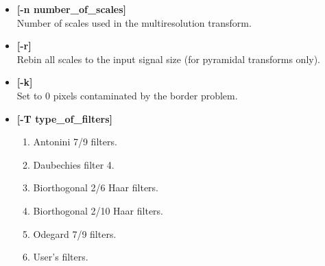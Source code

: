 \begin{itemize}
\begin{enumerate}
\begin{eqnarray}
\psi(x) =  \left \{
\begin{array}{ll}
     0  & \mbox{ if }  \mid \frac{x}{\sigma} \mid > 1 \\
     -1 & \mbox{ if } \mid  \frac{x}{\sigma} \mid \in [\frac{1}{3},1]  \\
     2  & \mbox{ if } \mid  \frac{x}{\sigma} \mid < \frac{1}{3}
\end{array}
\right.
\end{eqnarray}  
First scale $\sigma_0$ equal to $0.66$, and 12 voices per octave. 
\item Gaussian derivative wavelet transform \\
 Continuous wavelet transform. The wavelet is the first 
derivative of a Gaussian
 \begin{eqnarray}
 \psi(x) =  - x e^{-\frac{1}{2}x^2} 
 \end{eqnarray}
 First scale $\sigma_0$ equal to $\frac{1}{\sqrt{3}}$, and 12 voices per octave. 
\item (bi-) orthogonal transform. 
\item (bi-) orthogonal transform via lifting scheme. 
\item Wavelet packets.
\item Wavelet packets via lifting scheme. 
\item Wavelet packets using the \`a trous algorithm.
\end{enumerate}
\item {\bf [-n number\_of\_scales]} \\
Number of scales used in the multiresolution transform.
\item {\bf [-r]} \\
Rebin all scales to the input signal size 
(for pyramidal transforms only).
\item {\bf [-k]} \\
Set to 0 pixels contaminated by the border problem.
\item {\bf [-T type\_of\_filters]}  
{\small
\begin{enumerate}
\baselineskip=0.4truecm
\itemsep=0.1truecm
\item Antonini 7/9 filters. 
\item Daubechies filter 4. 
\item Biorthogonal 2/6 Haar filters.
\item Biorthogonal 2/10 Haar filters.
\item Odegard 7/9 filters.
\item User's filters.

\end{enumerate}}
\end{itemize}
